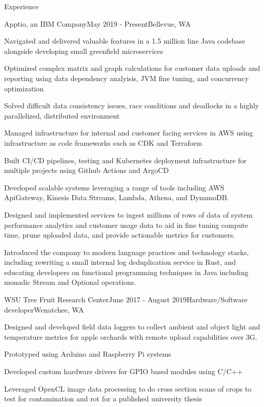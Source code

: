 \documentclass[
	11pt, %
]{resume} %
\begin{document}
\begin{rSection}{Experience}

   \begin{rSubsection}{Apptio, an IBM Company}{May 2019 - Present}{Bellevue, WA}{}
        \item Navigated and delivered valuable features in a 1.5 million line Java codebase alongside developing small greenfield microservices
        \item Optimized complex matrix and graph calculations for customer data uploads and reporting using data dependency analyisis, JVM fine tuning, and concurrency optimization
        \item Solved difficult data consistency issues, race conditions and deadlocks in a highly parallelized, distributed environment
        \item Managed infrastructure for internal and customer facing services in AWS using infrastructure as code frameworks such as CDK and Terraform
        \item Built CI/CD pipelines, testing and Kubernetes deployment infrastructure for multiple projects using Github Actions and ArgoCD
        \item Developed scalable systems leveraging a range of tools including AWS ApiGateway, Kinesis Data Streams, Lambda, Athena, and DynamoDB.
        \item Designed and implemented services to ingest millions of rows of data of system performance analytics and customer usage data to aid in fine tuning compute time, prune uploaded data, and provide actionable metrics for customers. 
        \item Introduced the company to modern language practices and technology stacks, including rewriting a small internal log deduplication service in Rust, and educating developers on functional programming techniques in Java including monadic Stream and Optional operations.
    \end{rSubsection}

    \begin{rSubsection}{WSU Tree Fruit Research Center}{June 2017 - August 2019}{Hardware/Software developer}{Wenatchee, WA}
        \item Designed and developed field data loggers to collect ambient and object light and temperature metrics for apple orchards with remote upload capabilities over 3G.
        \item Prototyped using Arduino and Raspberry Pi systems
        \item Developed custom hardware drivers for GPIO based modules using C/C++
        \item Leveraged OpenCL image data processing to do cross section scans of crops to test for contamination and rot for a published university thesis
    \end{rSubsection}

\end{rSection}
\end{document}
